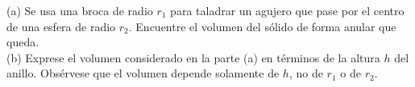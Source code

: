 \item (a) Se usa una broca de radio $r_1$ para taladrar un agujero que pase por el centro de una esfera de radio $r_2$. Encuentre el volumen del sólido de forma anular que queda. \\
(b) Exprese el volumen considerado en la parte (a) en términos de la altura $h$ del anillo. Obsérvese que el volumen depende solamente de $h$, no de $r_1$ o de $r_2$.
